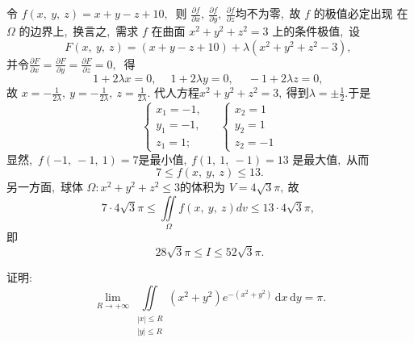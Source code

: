 	\begin{solution}
		令 $ f(x,\  y,\  z)=x+y-z+10 ,\ $ 则 $ \frac{\partial f}{\partial x},\  \frac{\partial f}{\partial y},\  \frac{\partial f}{\partial z}  $均不为零,\  故  $f$  的极值必定出现 在 $ \Omega $ 的边界上,\  换言之,\  需求  $f$ 在曲面 $ x^{2}+y^{2}+z^{2}=3$  上的条件极值,\  设
		$$F(x,\  y,\  z)=(x+y-z+10)+\lambda\left(x^{2}+y^{2}+z^{2}-3\right),\ $$
		并令$  \frac{\partial F}{\partial x}=\frac{\partial F}{\partial y}=\frac{\partial F}{\partial z}=0 ,\ $ 得
		$$1+2 \lambda x=0,\  \quad 1+2 \lambda y=0,\  \quad-1+2 \lambda z=0,\ $$
		故 $ x=-\frac{1}{2 \lambda},\  y=-\frac{1}{2 \lambda},\  z=\frac{1}{2 \lambda}.$ 代人方程$  x^{2}+y^{2}+z^{2}=3 ,\  $得到$  \lambda=\pm \frac{1}{2} . $于是
		$$\left\{\begin{array} { l } 
			{ x _ { 1 } = - 1 ,\  } \\
			{ y _ { 1 } = - 1 ,\  } \\
			{ z _ { 1 } = 1 ; }
		\end{array} \quad \left\{\begin{array}{l}
			x_{2}=1 \\
			y_{2}=1 \\
			z_{2}=-1
		\end{array}\right.\right.
		$$
		显然,\ $  f(-1,\ -1,\ 1)=7  $是最小值$,\   f(1,\ 1,\ -1)=13 $ 是最大值,\  从而
		$$7 \leqslant f(x,\  y,\  z) \leqslant 13 .$$
		另一方面,\  球体  $\Omega: x^{2}+y^{2}+z^{2} \leqslant 3  $的体积为 $ V=4 \sqrt{3} \pi ,\  $故
		$$7 \cdot 4 \sqrt{3} \pi \leqslant \iint\limits_{\Omega} f(x,\  y,\  z) d v \leqslant 13 \cdot 4 \sqrt{3} \pi,\ $$
		即
		$$28 \sqrt{3} \pi \leqslant I \leqslant 52 \sqrt{3} \pi .$$ 
	\end{solution}
	\newpage
	\begin{problem}
		证明:
		$$\lim\limits_{R \rightarrow+\infty} \iint\limits_{\substack{|x| \leqslant R \\|y| \leqslant R}}\left(x^{2}+y^{2}\right) e^{-\left(x^{2}+y^{2}\right)} \,\text{d} x \,\text{d} y=\pi.$$
	\end{problem}
	
